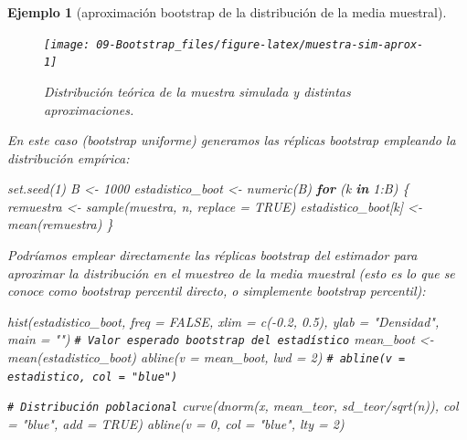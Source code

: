 \documentclass[
]{book}
\newenvironment{Shaded}{\begin{snugshade}}{\end{snugshade}}
\newcommand{\AttributeTok}[1]{\textcolor[rgb]{0.77,0.63,0.00}{#1}}
\newcommand{\CommentTok}[1]{\textcolor[rgb]{0.56,0.35,0.01}{\textit{#1}}}
\newcommand{\ConstantTok}[1]{\textcolor[rgb]{0.00,0.00,0.00}{#1}}
\newcommand{\ControlFlowTok}[1]{\textcolor[rgb]{0.13,0.29,0.53}{\textbf{#1}}}
\newcommand{\DecValTok}[1]{\textcolor[rgb]{0.00,0.00,0.81}{#1}}
\newcommand{\FloatTok}[1]{\textcolor[rgb]{0.00,0.00,0.81}{#1}}
\newcommand{\FunctionTok}[1]{\textcolor[rgb]{0.00,0.00,0.00}{#1}}
\newcommand{\NormalTok}[1]{#1}
\newcommand{\OtherTok}[1]{\textcolor[rgb]{0.56,0.35,0.01}{#1}}
\newcommand{\SpecialCharTok}[1]{\textcolor[rgb]{0.00,0.00,0.00}{#1}}
\newcommand{\StringTok}[1]{\textcolor[rgb]{0.31,0.60,0.02}{#1}}
\theoremstyle{break}
\newtheorem{example}{Ejemplo}[chapter]
\theoremstyle{nonumberplain}
\renewcommand{\CommentTok}[1]{\textcolor[rgb]{0.41,0.41,0.41}{\texttt{#1}}}
\begin{document}
\begin{example}[aproximación bootstrap de la distribución de la media muestral]
\begin{figure}[!htb]
{\centering \texttt{[image: 09-Bootstrap\_files/figure-latex/muestra-sim-aprox-1]} 

}

\caption{Distribución teórica de la muestra simulada y distintas aproximaciones.}\label{fig:muestra-sim-aprox}
\end{figure}

En este caso (bootstrap uniforme) generamos las réplicas bootstrap empleando la distribución empírica:

\begin{Shaded}
\begin{Highlighting}[]
\FunctionTok{set.seed}\NormalTok{(}\DecValTok{1}\NormalTok{)}
\NormalTok{B }\OtherTok{\textless{}{-}} \DecValTok{1000}
\NormalTok{estadistico\_boot }\OtherTok{\textless{}{-}} \FunctionTok{numeric}\NormalTok{(B)}
\ControlFlowTok{for}\NormalTok{ (k }\ControlFlowTok{in} \DecValTok{1}\SpecialCharTok{:}\NormalTok{B) \{}
\NormalTok{    remuestra }\OtherTok{\textless{}{-}} \FunctionTok{sample}\NormalTok{(muestra, n, }\AttributeTok{replace =} \ConstantTok{TRUE}\NormalTok{)}
\NormalTok{    estadistico\_boot[k] }\OtherTok{\textless{}{-}} \FunctionTok{mean}\NormalTok{(remuestra)}
\NormalTok{\}}
\end{Highlighting}
\end{Shaded}

Podríamos emplear directamente las réplicas bootstrap del estimador para aproximar la distribución en el muestreo de la media muestral (esto es lo que se conoce como bootstrap percentil directo, o simplemente bootstrap percentil):

\begin{Shaded}
\begin{Highlighting}[]
\FunctionTok{hist}\NormalTok{(estadistico\_boot, }\AttributeTok{freq =} \ConstantTok{FALSE}\NormalTok{, }\AttributeTok{xlim =} \FunctionTok{c}\NormalTok{(}\SpecialCharTok{{-}}\FloatTok{0.2}\NormalTok{, }\FloatTok{0.5}\NormalTok{),}
     \AttributeTok{ylab =} \StringTok{"Densidad"}\NormalTok{, }\AttributeTok{main =} \StringTok{""}\NormalTok{)}
\CommentTok{\# Valor esperado bootstrap del estadístico}
\NormalTok{mean\_boot }\OtherTok{\textless{}{-}} \FunctionTok{mean}\NormalTok{(estadistico\_boot)  }
\FunctionTok{abline}\NormalTok{(}\AttributeTok{v =}\NormalTok{ mean\_boot, }\AttributeTok{lwd =} \DecValTok{2}\NormalTok{)}
\CommentTok{\# abline(v = estadistico, col = "blue")}

\CommentTok{\# Distribución poblacional}
\FunctionTok{curve}\NormalTok{(}\FunctionTok{dnorm}\NormalTok{(x, mean\_teor, sd\_teor}\SpecialCharTok{/}\FunctionTok{sqrt}\NormalTok{(n)), }\AttributeTok{col =} \StringTok{"blue"}\NormalTok{, }\AttributeTok{add =} \ConstantTok{TRUE}\NormalTok{)}
\FunctionTok{abline}\NormalTok{(}\AttributeTok{v =} \DecValTok{0}\NormalTok{, }\AttributeTok{col =} \StringTok{"blue"}\NormalTok{, }\AttributeTok{lty =} \DecValTok{2}\NormalTok{)}
\end{Highlighting}
\end{Shaded}


\end{example}
\end{document}
